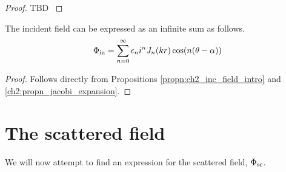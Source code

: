     \begin{proof} TBD \cite[$\S$2.5]{martin06scattering}
    \end{proof}
%
    \begin{propn}\label{propn:ch2_inc_field_infty_sum}
    The incident field can be expressed as an infinite sum as follows.
        \begin{equation*}\label{eq:ch2_inc_field_infty_sum}
            \Phi_{\text{in}} = \sum^{\infty}_{n=0} \epsilon_n i^n J_n(kr) \cos (n(\theta - \alpha))
        \end{equation*}
    \end{propn}
    \begin{proof}
    Follows directly from Propositions \ref{propn:ch2_inc_field_intro} and  \ref{ch2:propn_jacobi_expansion}.
    \end{proof}
\section{The scattered field}\label{ss:scattered_field}
We will now attempt to find an expression for the scattered field, $\Phi_{\text{sc}}$.
